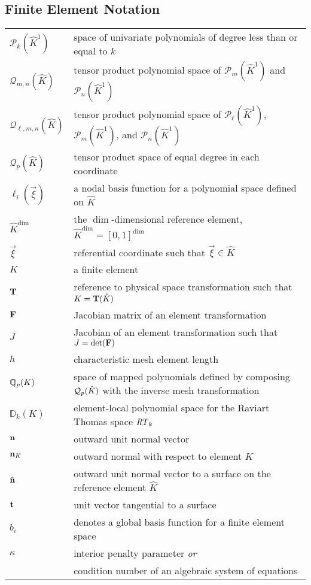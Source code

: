 \documentclass[../doc.tex]{subfiles}
\begin{document}
\subsection*{Finite Element Notation}
\begin{longtable}{p{2cm}p{12cm}}
$\mathcal{P}_k(\hat{K}^1)$ & space of univariate polynomials of degree less than or equal to $k$ \\
$\mathcal{Q}_{m,n}(\hat{K})$ & tensor product polynomial space of $\mathcal{P}_m(\hat{K}^1)$ and $\mathcal{P}_n(\hat{K}^1)$ \\
$\mathcal{Q}_{\ell,m,n}(\hat{K})$ & tensor product polynomial space of $\mathcal{P}_\ell(\hat{K}^1)$, $\mathcal{P}_m(\hat{K}^1)$, and $\mathcal{P}_n(\hat{K}^1)$ \\
$\mathcal{Q}_p(\hat{K})$ & tensor product space of equal degree in each coordinate \\ 
$\ell_i(\vec{\xi})$ & a nodal basis function for a polynomial space defined on $\hat{K}$ \\
$\hat{K}^{\dim}$ & the $\dim$-dimensional reference element, $\hat{K}^{\dim} = [0,1]^{\dim}$ \\
$\vec{\xi}$ & referential coordinate such that $\vec{\xi} \in \hat{K}$ \\
$K$ & a finite element \\
$\boldsymbol{\mathrm{T}}$ & reference to physical space transformation such that $K = \boldsymbol{\mathrm{T}}(\hat{K})$ \\
$\boldsymbol{\mathrm{F}}$ & Jacobian matrix of an element transformation \\
$J$ & Jacobian of an element transformation such that $J = \det(\boldsymbol{\mathrm{F}})$ \\
$h$ & characteristic mesh element length \\
$\mathbb{Q}_{p}(K)$ & space of mapped polynomials defined by composing $\mathcal{Q}_{p}(\hat{K})$ with the inverse mesh transformation \\
$\mathbb{D}_k(K)$ & element-local polynomial space for the Raviart Thomas space $\mathit{RT}_k$ \\
$\boldsymbol{\mathrm{n}}$ & outward unit normal vector \\ 
$\boldsymbol{\mathrm{n}}_K$ & outward normal with respect to element $K$ \\
$\hat{\boldsymbol{\mathrm{n}}}$ & outward unit normal vector to a surface on the reference element $\hat{K}$ \\
$\boldsymbol{\mathrm{t}}$ & unit vector tangential to a surface \\
$b_i$ & denotes a global basis function for a finite element space \\
$\kappa$ & interior penalty parameter \emph{or} \\ 
& condition number of an algebraic system of equations \\


\end{longtable}
\end{document}
